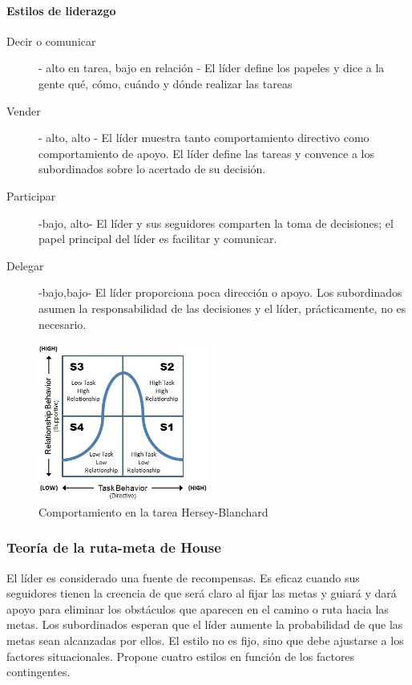 \documentclass[12pt]{article}
\theoremstyle{definition_wo_parentheses}
\begin{document}
\paragraph{Estilos de liderazgo}
\begin{description}
\item[Decir o comunicar] - alto en tarea, bajo en relación - El líder define los papeles y dice a la gente qué, cómo, cuándo y dónde realizar las tareas
\item[Vender] - alto, alto - El líder muestra tanto comportamiento directivo como comportamiento de apoyo. El líder define las tareas y convence a los subordinados sobre lo acertado de su decisión. 
\item[Participar] -bajo, alto- El líder y sus seguidores comparten la toma de decisiones; el papel principal del líder es facilitar y comunicar.
\item[Delegar] -bajo,bajo- El líder proporciona poca dirección o apoyo. Los subordinados asumen la responsabilidad de las decisiones y el líder, prácticamente, no es necesario.
\end{description}


\begin{figure}[H]
 \centering
 \includegraphics[width=0.5\textwidth]{Hersey-Blanchard}
 \caption{Comportamiento en la tarea Hersey-Blanchard}
\end{figure}


\subsubsection{Teoría de la ruta-meta de House}

	El líder es considerado una fuente de recompensas. Es eficaz cuando sus seguidores tienen la creencia de que será claro al fijar las metas y guiará y dará apoyo para eliminar los obstáculos que aparecen en el camino o ruta hacia las metas. Los subordinados esperan que el líder aumente la probabilidad de que las metas sean alcanzadas por ellos. El estilo no es fijo, sino que debe ajustarse a los factores situacionales. Propone cuatro estilos en función de los factores contingentes.
	
\end{document}
